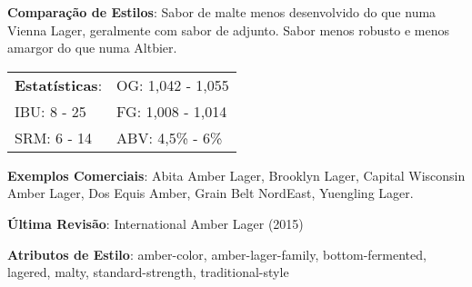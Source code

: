 \textbf{Comparação de Estilos}: Sabor de malte menos desenvolvido do que numa Vienna Lager, geralmente com sabor de adjunto. Sabor menos robusto e menos amargor do que numa Altbier.

\begin{tabular}{@{}p{35mm}p{35mm}@{}}
  \textbf{Estatísticas}: & OG: 1,042 - 1,055 \\
  IBU: 8 - 25 & FG: 1,008 - 1,014 \\
  SRM: 6 - 14 & ABV: 4,5\% - 6\%
\end{tabular}

\textbf{Exemplos Comerciais}: Abita Amber Lager, Brooklyn Lager, Capital Wisconsin Amber Lager, Dos Equis Amber, Grain Belt NordEast, Yuengling Lager.

\textbf{Última Revisão}: International Amber Lager (2015)

\textbf{Atributos de Estilo}: amber-color, amber-lager-family, bottom-fermented, lagered, malty, standard-strength, traditional-style